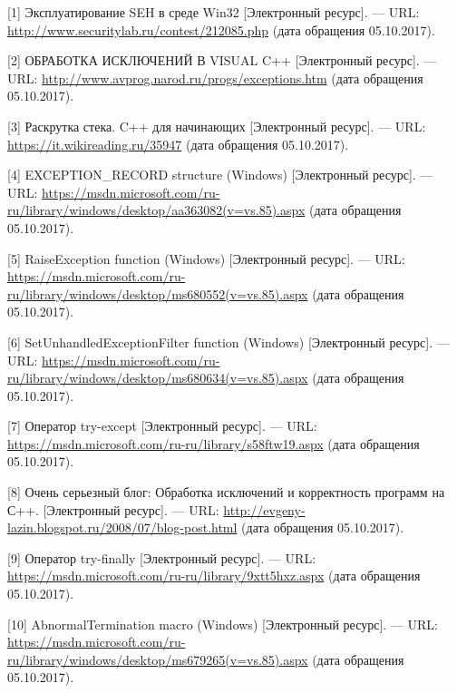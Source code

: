 \documentclass[14pt,a4paper,report]{report}
\begin{document}
\begin{flushleft}

[1] Эксплуатирование SEH в среде Win32 [Электронный ресурс]. — URL: \href{http://www.securitylab.ru/contest/212085.php}{http://www.securitylab.ru/contest/212085.php} (дата обращения 05.10.2017).
\linebreak
	
[2] ОБРАБОТКА ИСКЛЮЧЕНИЙ В VISUAL C++ [Электронный ресурс]. — URL: \href{http://www.avprog.narod.ru/progs/exceptions.htm}{http://www.avprog.narod.ru/progs/exceptions.htm} (дата обращения 05.10.2017).
\linebreak
	
[3] Раскрутка стека. C++ для начинающих [Электронный ресурс]. — URL: \href{https://it.wikireading.ru/35947}{https://it.wikireading.ru/35947} (дата обращения 05.10.2017).
\linebreak
	
[4] EXCEPTION\_RECORD structure (Windows) [Электронный ресурс]. — URL: \href{https://msdn.microsoft.com/ru-ru/library/windows/desktop/aa363082(v=vs.85).aspx}{https://msdn.microsoft.com/ru-ru/library/windows/desktop/aa363082(v=vs.85).aspx} (дата обращения 05.10.2017).
\linebreak
	
[5] RaiseException function (Windows) [Электронный ресурс]. — URL: \href{https://msdn.microsoft.com/ru-ru/library/windows/desktop/ms680552(v=vs.85).aspx}{https://msdn.microsoft.com/ru-ru/library/windows/desktop/ms680552(v=vs.85).aspx} (дата обращения 05.10.2017).
\linebreak
	
[6] SetUnhandledExceptionFilter function (Windows) [Электронный ресурс]. — URL: \href{https://msdn.microsoft.com/ru-ru/library/windows/desktop/ms680634(v=vs.85).aspx}{https://msdn.microsoft.com/ru-ru/library/windows/desktop/ms680634(v=vs.85).aspx} (дата обращения 05.10.2017).
\linebreak
	
[7] Оператор try-except [Электронный ресурс]. — URL: \href{https://msdn.microsoft.com/ru-ru/library/s58ftw19.aspx}{https://msdn.microsoft.com/ru-ru/library/s58ftw19.aspx} (дата обращения 05.10.2017).
\linebreak
	
[8] Очень серьезный блог: Обработка исключений и корректность программ на С++. [Электронный ресурс]. — URL: \href{http://evgeny-lazin.blogspot.ru/2008/07/blog-post.html}{http://evgeny-lazin.blogspot.ru/2008/07/blog-post.html} (дата обращения 05.10.2017).
\linebreak
	
[9] Оператор try-finally [Электронный ресурс]. — URL: \href{https://msdn.microsoft.com/ru-ru/library/9xtt5hxz.aspx}{https://msdn.microsoft.com/ru-ru/library/9xtt5hxz.aspx} (дата обращения 05.10.2017).
\linebreak
	
[10] AbnormalTermination macro (Windows) [Электронный ресурс]. — URL: \href{https://msdn.microsoft.com/ru-ru/library/windows/desktop/ms679265(v=vs.85).aspx}{https://msdn.microsoft.com/ru-ru/library/windows/desktop/ms679265(v=vs.85).aspx} (дата обращения 05.10.2017).
\linebreak

\end{flushleft}
\end{document}
